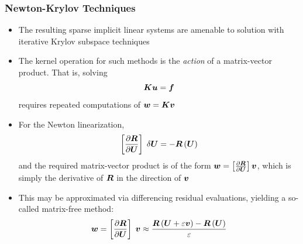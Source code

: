 \documentclass[compress,11pt]{beamer}
\begin{document}
\frame
{
  \frametitle{\scriptsize Newton-Krylov Techniques}
  \vspace{-1em}
  \footnotesize
  
  \begin{itemize}
    \item The resulting sparse implicit linear systems are amenable to solution with iterative Krylov subspace techniques
    \item The kernel operation for such methods is the \emph{action} of a matrix-vector product.  That is, solving
      \begin{equation*}
	{\boldsymbol{K}} {\boldsymbol{u}} = {\boldsymbol{f}}
      \end{equation*}
      requires repeated computations of ${\boldsymbol{w}}={\boldsymbol{K}}{\boldsymbol{v}}$
    \item For the Newton linearization,
      \begin{equation*}
	\left[{\frac{\partial{{\boldsymbol{R}}}}{\partial{{\boldsymbol{U}}}}}\right]\;\delta{\boldsymbol{U}} = -{\boldsymbol{R}}\left({\boldsymbol{U}}\right)
      \end{equation*}
      and the required matrix-vector product is of the form ${\boldsymbol{w}}=\left[{\frac{\partial{{\boldsymbol{R}}}}{\partial{{\boldsymbol{U}}}}}\right]{\boldsymbol{v}}$, which is simply the derivative of ${\boldsymbol{R}}$ in the direction of ${\boldsymbol{v}}$
    \item This may be approximated via differencing residual evaluations, yielding a so-called matrix-free method:
      \begin{equation*}
	{\boldsymbol{w}} = \left[{\frac{\partial{{\boldsymbol{R}}}}{\partial{{\boldsymbol{U}}}}}\right]\;{\boldsymbol{v}} \approx \frac{{\boldsymbol{R}}\left({\boldsymbol{U}} + \varepsilon {\boldsymbol{v}}\right) - {\boldsymbol{R}}\left({\boldsymbol{U}}\right)}{\varepsilon}
	\label{eq:comp_linsolve_mf}
      \end{equation*}
  \end{itemize}
}
\end{document}
